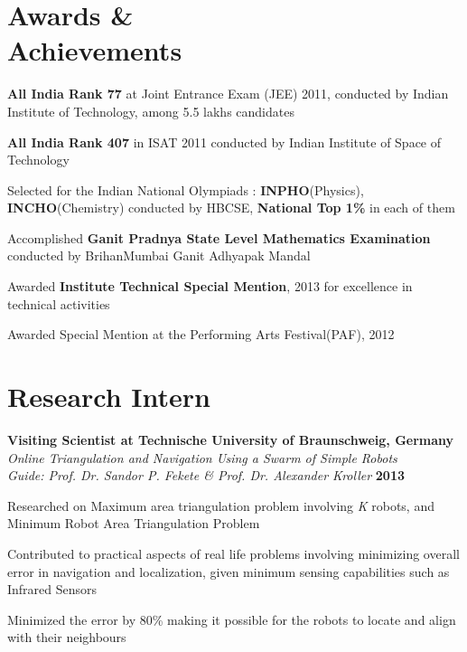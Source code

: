 \documentclass[margin,11pt]{resume}
\begin{document}
\begin{resume}

\vspace{45mm}

\section{\mysidestyle Awards \&\\ Achievements}

\begin{list2}
    \item \textbf {All India Rank 77} at Joint Entrance Exam (JEE) 2011, conducted by Indian Institute of Technology, among 5.5 lakhs candidates 
    \item \textbf {All India Rank 407} in ISAT 2011 conducted by Indian Institute of Space of Technology 
    \item Selected for the Indian National Olympiads : \textbf{INPHO}(Physics), \textbf{INCHO}(Chemistry) conducted by HBCSE, \textbf{National Top 1\%} in each of them
    \item Accomplished \textbf {Ganit Pradnya State Level Mathematics Examination} conducted by BrihanMumbai Ganit Adhyapak Mandal
    \item Awarded \textbf{Institute Technical Special Mention}, 2013 for excellence in technical activities
    \item Awarded Special Mention at the Performing Arts Festival(PAF), 2012
				
    \vspace{-3mm}
\end{list2}\vspace{0.25mm}

\section{\mysidestyle Research Intern}
				\textbf{Visiting Scientist at  Technische University of Braunschweig, Germany\\} \emph{Online Triangulation and Navigation Using a Swarm of Simple Robots}\\
				\emph{Guide: Prof. Dr. Sandor P. Fekete \& Prof. Dr. Alexander Kroller} \hfill {\textbf{2013}} \vspace{-4mm}\\
				\begin{list2}	
                    \item Researched on Maximum area triangulation problem involving \emph{K} robots, and Minimum Robot Area Triangulation Problem
                    \item Contributed to practical aspects of real life problems involving minimizing overall error in navigation and localization, given minimum sensing capabilities such as Infrared Sensors  
                    \item Minimized the error by 80\% making it possible for the robots to locate and align with their neighbours
				\end{list2}
\vspace{-3mm}


\end{resume}
\end{document}
